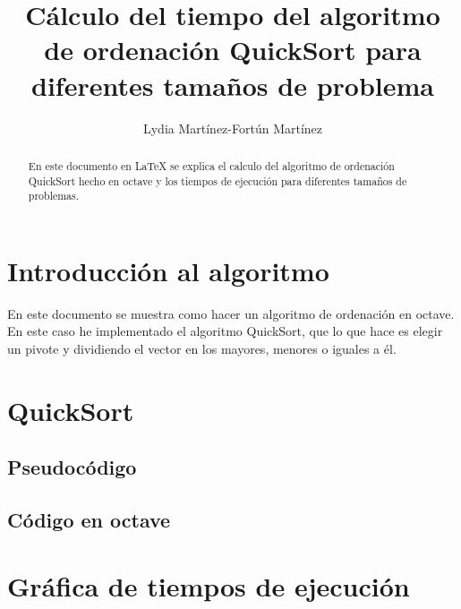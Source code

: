 \documentclass[a4,12pt]{article}
\title{Cálculo del tiempo del algoritmo de ordenación QuickSort para diferentes tamaños de problema}
\author{Lydia Martínez-Fortún Martínez}
\begin{document}
\maketitle



\begin{abstract}
En este documento en \LaTeX{} se explica el calculo del algoritmo de ordenación QuickSort hecho en octave y los tiempos de ejecución para diferentes tamaños de problemas.
\end{abstract}

\tableofcontents

\newpage

\section{Introducción al algoritmo}

En este documento se muestra como hacer un algoritmo de ordenación en octave. En este caso he implementado el algoritmo QuickSort, que lo que hace es elegir un pivote y dividiendo el vector en los mayores, menores o iguales a él.



\section{QuickSort}


\subsection{Pseudocódigo}

\subsection{Código en octave}



\section{Gráfica de tiempos de ejecución}




\end{document}
